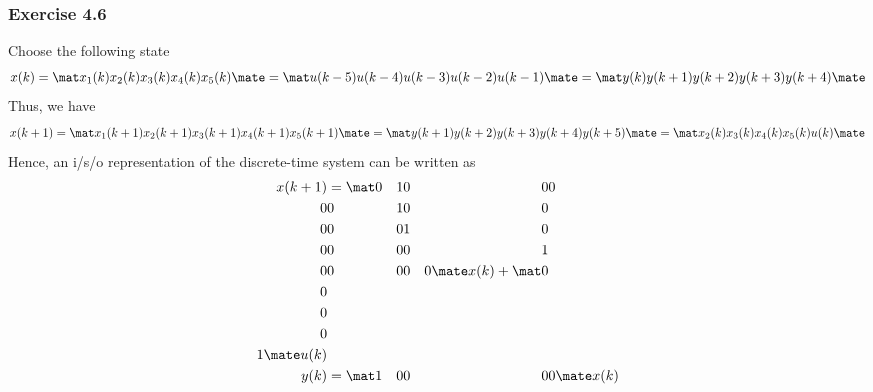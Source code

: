 \subsubsection{Exercise 4.6}
Choose the following state
\begin{equation}
    x(k) = \mat x_1(k) \\ x_2(k) \\ x_3(k) \\ x_4(k) \\ x_5(k) \mate = \mat u(k-5) \\ u(k-4) \\ u(k-3) \\ u(k-2) \\ u(k-1) \mate = \mat y(k) \\ y(k+1) \\ y(k+2) \\ y(k+3) \\ y(k+4) \mate
\end{equation}
Thus, we have
\begin{equation}
    x(k+1) = \mat x_1(k+1) \\ x_2(k+1) \\ x_3(k+1) \\ x_4(k+1) \\ x_5(k+1) \mate = \mat y(k+1) \\ y(k+2) \\ y(k+3) \\ y(k+4) \\ y(k+5) \mate = \mat x_2(k) \\ x_3(k) \\ x_4(k) \\ x_5(k) \\ u(k) \mate
\end{equation}
Hence, an i/s/o representation of the discrete-time system can be written as
\begin{equation}
    \begin{aligned}
        x(k+1) &= \mat 0 &1 &0 &0 &0  \\ 0 &0 &1 &0 &0 \\ 0 &0 &0 &1 &0 \\ 0 &0 &0 &0 &1 \\ 0 &0 &0 &0 &0 \mate x(k) + \mat 0 \\ 0 \\ 0 \\ 0 \\ 1 \mate u(k) \\
        y(k) &= \mat 1 &0 &0 &0 &0 \mate x(k)
    \end{aligned}
\end{equation}


